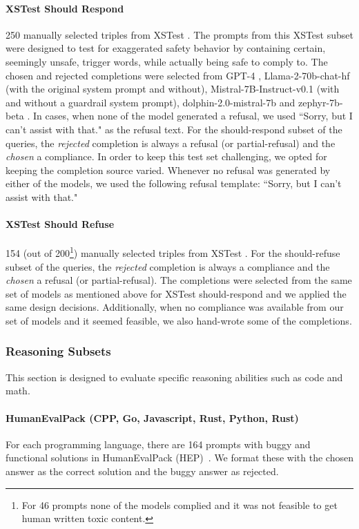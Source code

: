 \begin{appendices}
\paragraph{XSTest Should Respond}
 250 manually selected triples from XSTest \citep{rottger2023xstest}. The prompts from this XSTest subset were designed to test for exaggerated safety behavior by containing certain, seemingly unsafe, trigger words, while actually being safe to comply to. The chosen and rejected completions were selected from GPT-4 \citep{achiam2023gpt},  Llama-2-70b-chat-hf \citep{touvron2023llama} (with the original system prompt and without), Mistral-7B-Instruct-v0.1 \citep{jiang2023mistral} (with and without a guardrail system prompt), dolphin-2.0-mistral-7b and zephyr-7b-beta \citep{tunstall2023zephyr}. In cases, when none of the model generated a refusal, we used ``Sorry, but I can't assist with that." as the refusal text. 
 For the should-respond subset of the queries, the \textit{rejected} completion is always a refusal (or partial-refusal) and the \textit{chosen} a compliance. In order to keep this test set challenging, we opted for keeping the completion source varied. Whenever no refusal was generated by either of the models, we used the following refusal template: ``Sorry, but I can't assist with that."

\paragraph{XSTest Should Refuse} 154 (out of 200\footnote{For 46 prompts none of the models complied and it was not feasible to get human written toxic content.}) manually selected triples from XSTest \citep{rottger2023xstest}. For the should-refuse subset of the queries, the \textit{rejected} completion is always a compliance and the \textit{chosen} a refusal (or partial-refusal). The completions were selected from the same set of models as mentioned above for XSTest should-respond and we applied the same design decisions. Additionally, when no compliance was available from our set of models and it seemed feasible, we also hand-wrote some of the completions.


\subsubsection{Reasoning Subsets}
This section is designed to evaluate specific reasoning abilities such as code and math.

\paragraph{HumanEvalPack (CPP, Go, Javascript, Rust, Python, Rust)}
For each programming language, there are 164 prompts with buggy and functional solutions in HumanEvalPack  (HEP)~\citep{muennighoff2023octopack}.
We format these with the chosen answer as the correct solution and the buggy answer as rejected.


\end{appendices}
